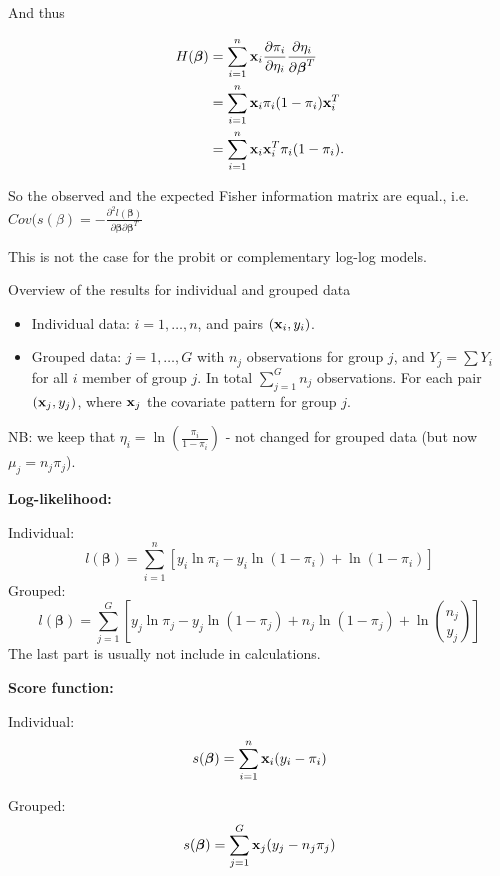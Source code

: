 \documentclass[
  ignorenonframetext,
]{beamer}
\providecommand{\tightlist}{%
  \setlength{\itemsep}{0pt}\setlength{\parskip}{0pt}}
\begin{document}
\begin{frame}
And thus

\[
\begin{aligned}
H(\boldsymbol{\beta}) &=\sum_{i=1}^n {\bf x}_i \frac{\partial \pi_i}{\partial \eta_i} \frac{\partial \eta_i}{\partial \boldsymbol{\beta}^T} \\
&=\sum_{i=1}^n {\bf x}_i\pi_i(1-\pi_i) {\bf x}_i^T\\
&= \sum_{i=1}^n {\bf x}_i{\bf x}_i^T \pi_i(1-\pi_i).
\end{aligned}
\]

So the observed and the expected Fisher information matrix are equal.,
i.e.~\(Cov(s(\beta) = -\frac{\partial^2l(\boldsymbol{\beta})}{\partial\boldsymbol{\beta}\partial\boldsymbol{\beta}^T}\)

This is not the case for the probit or complementary log-log models.
\end{frame}

\begin{frame}
\begin{block}{Overview of the results for individual and grouped data}
\label{overview-of-the-results-for-individual-and-grouped-data}
\begin{itemize}
\tightlist
\item
  Individual data: \(i=1,\ldots, n\), and pairs \(({\bf x}_i,y_i)\).
\item
  Grouped data: \(j=1,\ldots, G\) with \(n_j\) observations for group
  \(j\), and \(Y_j=\sum Y_i\) for all \(i\) member of group \(j\). In
  total \(\sum_{j=1}^G n_j\) observations. For each pair
  \(({\bf x}_j, y_j)\), where \({\bf x}_j\) the covariate pattern for
  group \(j\).
\end{itemize}

NB: we keep that \(\eta_i=\ln (\frac{\pi_i}{1-\pi_i})\) - not changed
for grouped data (but now \(\mu_j=n_j\pi_j\)).
\end{block}
\end{frame}

\begin{frame}
\textbf{Log-likelihood:}

Individual:
\[l(\boldsymbol{\beta})=\sum_{i=1}^n[y_i \ln \pi_i-y_i\ln(1-\pi_i)+\ln(1-\pi_i)]\]
Grouped:
\[l(\boldsymbol{\beta})=\sum_{j=1}^G[y_j \ln \pi_j-y_j\ln(1-\pi_j)+n_j\ln(1-\pi_j)+ \ln {n_j \choose y_j}]\]
The last part is usually not include in calculations.
\end{frame}

\begin{frame}
\textbf{Score function:}

Individual: \[s(\boldsymbol{\beta})=\sum_{i=1}^n {\bf x}_i (y_i-\pi_i)\]

Grouped: \[s(\boldsymbol{\beta})=\sum_{j=1}^G {\bf x}_j (y_j-n_j\pi_j)\]
\end{frame}
\end{document}
